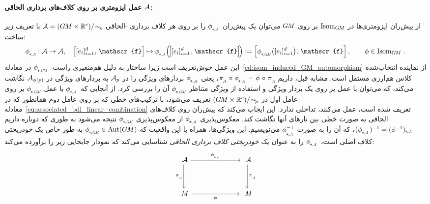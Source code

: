 \paragraph{عمل ایزومتری بر روی کلاف‌های برداری الحاقی $\mathcal{A}$:}
از پیش‌ران ایزومتری‌ها در $\operatorname{Isom}_{G\mkern-1.4muM}$ بر روی $G\mkern-1.4muM$ می‌توان یک پیش‌ران $\dphiA$ را بر روی هر کلاف برداری -الحاقی $\mathcal{A} = (G\mkern-1.4muM\times\mathbb{R}^c)/\!\sim_{\!\rho}$ با تعریف زیر ساخت:
\begin{align}\label{eq:pushforward_A_def}
    \dphiA\!: \A \to \A,\ \ \
    \pig[[e_i]_{i=1}^d,\, \mathscr{f}\pig]
    \mapsto \dphiA\!\Big(\! \pig[[e_i]_{i=1}^d,\, \mathscr{f}\pig] \!\Big)
    := \Big[\dphiGM \big([e_i]_{i=1}^d \big),\, \mathscr{f}\Big] \,,
    \qquad \phi \in \IsomGM \,.
\end{align}
این عمل خوش‌تعریف است زیرا ساختار به دلیل هم‌متغیری راست- $\dphiGM$ در معادله~\eqref{cd:isom_induced_GM_automorphism} از نماینده انتخاب‌شده کلاس هم‌ارزی مستقل است.
مشابه قبل، داریم $\piA\mkern2mu\circ\mkern2mu \dphiA = \phi\mkern2mu \circ\mkern2mu \piA$، یعنی $\dphiA$ بردارهای ویژگی را در $\mathcal{A}_p$ به بردارهای ویژگی در $\mathcal{A}_{\phi(p)}$ نگاشت می‌کند، که می‌توان با عمل بر روی یک بردار ویژگی و استفاده از ویژگی متناظر $\dphiGM$ آن را بررسی کرد.
از آنجایی که $\dphiA$ با عمل $\dphiGM$ بر روی عامل اول در $(G\mkern-1.4muM\times\mathbb{R}^c)/\!\sim_{\!\rho}$ تعریف می‌شود، با ترکیب‌های خطی که بر روی عامل دوم همانطور که در معادله~\eqref{eq:associated_bdl_linear_combination} تعریف شده است، عمل می‌کنند، تداخلی ندارد.
این ایجاب می‌کند که پیش‌ران روی کلاف‌های الحاقی به صورت خطی بین تارهای آنها نگاشت کند.
معکوس‌پذیری $\dphiA$ از معکوس‌پذیری $\dphiGM$ نتیجه می‌شود به طوری که دوباره داریم $(\dphiA)^{-1} = (\phi^{-1})_{\mkern-2mu*\mkern-1mu\scalebox{.55}{$,\mkern-2mu \A$}}$، که آن را به صورت $\dphiAinv$ می‌نویسیم.
این ویژگی‌ها، همراه با این واقعیت که $\dphiGM \in \Aut(\GM)$ به طور خاص یک خودریختی کلاف اصلی است، $\dphiA$ را به عنوان یک \emph{خودریختی کلاف برداری الحاقی} شناسایی می‌کند که نمودار جابجایی زیر را برآورده می‌کند:
\begin{equation}\label{cd:associated_bdl_automorphism}
\begin{tikzcd}[column sep=70pt, row sep=35, font=\normalsize]
    \A
        \arrow[r, "\dphiA"]
        \arrow[d, "\piA"']
    &
    \A
        \arrow[d, "\piA"]
    \\
    M
        \arrow[r, "\phi"']
    &
    M
\end{tikzcd}
\end{equation}

